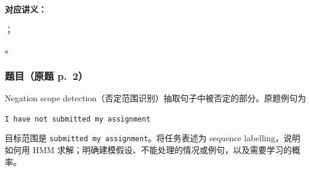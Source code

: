 
\textbf{对应讲义：}\par
{}；\par
{}。

\subsubsection*{题目（原题 p.~2）}

Negation scope detection（否定范围识别）抽取句子中被否定的部分。原题例句为
\begin{center}
\texttt{I have not submitted my assignment}
\end{center}
目标范围是 \texttt{submitted my assignment}。将任务表述为 sequence labelling，说明如何用 HMM 求解；明确建模假设、不能处理的情况或例句，以及需要学习的概率。

